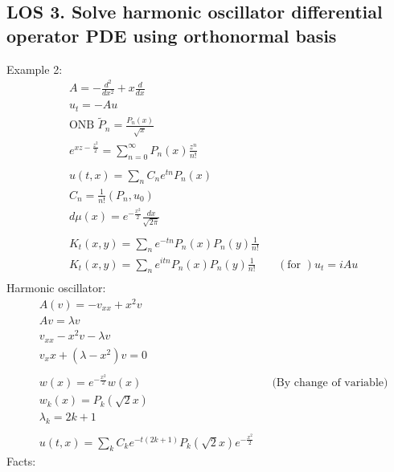 \documentclass[12pt, a4paper]{article}
\begin{document}
\subsection*{LOS 3. Solve harmonic oscillator differential operator PDE using orthonormal basis}
Example 2:
\begin{align*}
    &A = -\frac{d^2}{dx^2} + x\frac{d}{dx}\\
    &u_t = -Au\\
    &\text{ONB }\tilde{P}_n = \frac{P_n(x)}{\sqrt{x}}\\
    &e^{xz-\frac{z^2}{2}} = \sum_{n=0}^\infty P_n(x)\frac{z^n}{n!}\\\\
    &u(t, x) = \sum_n C_ne^{tn}P_n(x)\\
    &C_n = \frac{1}{n!}(P_n, u_0)\\
    &d\mu(x) = e^{-\frac{x^2}{2}}\frac{dx}{\sqrt{2\pi}}\\\\
    &K_t(x, y) = \sum_n e^{-tn}P_n(x)P_n(y)\frac{1}{n!}\\
    &K_t(x, y) = \sum_n e^{itn}P_n(x)P_n(y)\frac{1}{n!}&&(\text{for })u_t = iAu\\
\end{align*}
Harmonic oscillator:
\begin{align*}
    &A(v) = -v_{xx} + x^2v\\
    &Av = \lambda v\\
    &v_{xx}-x^2v - \lambda v\\
    &v_xx + (\lambda - x^2)v = 0\\\\
    &w(x) = e^{-\frac{x^2}{2}}w(x)&&\text{(By change of variable)}\\
    &w_k(x) = P_k(\sqrt{2}x)\\
    &\lambda_k = 2k+1\\\\
    &u(t, x) = \sum_kC_ke^{-t(2k+1)}P_k(\sqrt{2}x)e^{-\frac{x^2}{2}}
\end{align*}
Facts:
\end{document}
